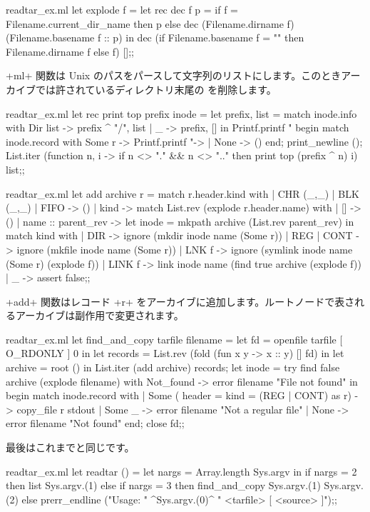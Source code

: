 \begin{answer}
%
\begin{listingcodefile}{readtar_ex.ml}
let explode f =
  let rec dec f p =
    if f = Filename.current_dir_name then p
    else dec (Filename.dirname f) (Filename.basename f :: p) in
  dec (if Filename.basename f = "" then Filename.dirname f else f) [];;
\end{listingcodefile}
%
\ml+ml+ 関数は Unix のパスをパースして文字列のリストにします。このときアーカイブでは許されているディレクトリ末尾の \quotes{\ml+/+} を削除します。
%
\begin{codefile}{readtar_ex.ml}
let rec print top prefix inode  =
  let prefix, list =
    match inode.info
    with Dir list -> prefix ^ "/", list
    | _ -> prefix, [] in
  Printf.printf "%
  begin match inode.record with
    Some r ->  Printf.printf "-> %
  | None -> ()
  end;
  print_newline ();
  List.iter (function n, i ->
    if n <> "." && n <> ".." then  print top (prefix ^ n) i) list;;
\end{codefile}
%
\begin{listingcodefile}{readtar_ex.ml}
let add archive r =
  match r.header.kind with
  | CHR (_,_) | BLK (_,_) | FIFO -> ()
  | kind ->
      match List.rev (explode r.header.name) with
      | []  -> ()
      | name :: parent_rev ->
          let inode = mkpath archive (List.rev parent_rev) in
          match kind with
          | DIR -> ignore (mkdir inode name (Some r))
          | REG | CONT -> ignore (mkfile inode name (Some r))
          | LNK f -> ignore (symlink inode name (Some r) (explode f))
          | LINK f -> link inode name (find true archive (explode f))
          | _ -> assert false;;
\end{listingcodefile}
%
\ml+add+ 関数はレコード \ml+r+ をアーカイブに追加します。ルートノードで表されるアーカイブは副作用で変更されます。
%
\begin{listingcodefile}{readtar_ex.ml}
let find_and_copy tarfile filename =
  let fd = openfile tarfile [ O_RDONLY ] 0 in
  let records = List.rev (fold (fun x y -> x :: y) [] fd) in
  let archive = root () in
  List.iter (add archive) records;
  let inode =
    try find false archive (explode filename)
    with Not_found -> error filename "File not found" in
  begin match inode.record with
  | Some ({ header = { kind = (REG | CONT) }} as r) -> copy_file r stdout
  | Some _ -> error filename "Not a regular file"
  | None -> error filename "Not found"
  end;
  close fd;;
\end{listingcodefile}
%
最後はこれまでと同じです。
\begin{listingcodefile}{readtar_ex.ml}
let readtar () =
  let nargs = Array.length Sys.argv in
  if nargs = 2 then list Sys.argv.(1)
  else if nargs = 3 then find_and_copy Sys.argv.(1) Sys.argv.(2)
  else prerr_endline ("Usage: " ^Sys.argv.(0)^ " <tarfile> [ <source> ]");;


\end{listingcodefile}
\end{answer}
